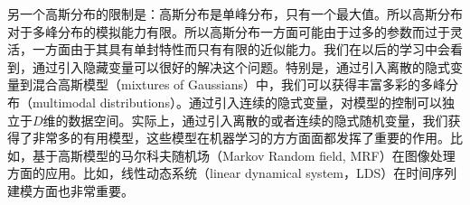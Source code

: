 \documentclass[10pt,a4paper,UTF8]{article}
\begin{document}
另一个高斯分布的限制是：高斯分布是单峰分布，只有一个最大值。所以高斯分布对于多峰分布的模拟能力有限。所以高斯分布一方面可能由于过多的参数而过于灵活，一方面由于其具有单封特性而只有有限的近似能力。我们在以后的学习中会看到，通过引入隐藏变量可以很好的解决这个问题。特别是，通过引入离散的隐式变量到混合高斯模型（mixtures of Gaussians）中，我们可以获得丰富多彩的多峰分布（multimodal distributions）。通过引入连续的隐式变量，对模型的控制可以独立于\(D\)维的数据空间。实际上，通过引入离散的或者连续的隐式随机变量，我们获得了非常多的有用模型，这些模型在机器学习的方方面面都发挥了重要的作用。比如，基于高斯模型的马尔科夫随机场（Markov Random field, MRF）在图像处理方面的应用。比如，线性动态系统（linear dynamical system，LDS）在时间序列建模方面也非常重要。
\end{document}
